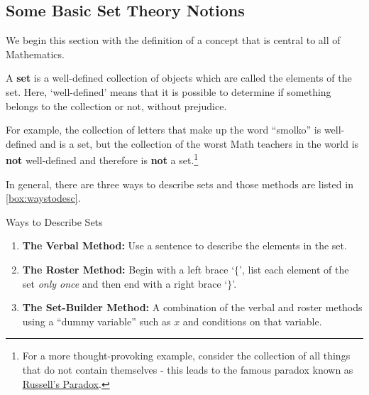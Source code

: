 

\setcounter{footnote}{0}

\label{AppSetTheory}

\subsection{Some Basic Set Theory Notions}
\label{SetTheoryNotions}

We begin this section with the definition of a concept that is central to all of Mathematics.

\medskip

\begin{tcolorbox}
\begin{defn} \label{setdef}

A \textbf{set} is a well-defined collection of objects which are called the elements of the set.  Here, `well-defined' means that it is possible to determine if something belongs to the collection or not, without prejudice. 
\end{defn}
\end{tcolorbox}

For example, the collection of letters that make up the word ``smolko'' is well-defined and is a set, but the collection of the worst Math teachers in the world is \textbf{not} well-defined and therefore is \textbf{not} a set.\footnote{For a more thought-provoking example, consider the collection of all things that do not contain themselves - this leads to the famous paradox known as \href{http://en.wikipedia.org/wiki/Russell's_paradox}{\underline{Russell's Paradox}}.}  

In general, there are three ways to describe sets and those methods are listed in \autoref{box:waystodesc}.

\begin{floatbox}{Ways to Describe Sets}
\label{box:waystodesc}
\begin{enumerate}

\item \textbf{The Verbal Method:} Use a sentence to describe the elements in the set.

\item \textbf{The Roster Method:}  Begin with a left brace `$\{$', list each element of the set \textit{only once} and then end with a right brace `$\}$'.

\item \textbf{The Set-Builder Method:} A combination of the verbal and roster methods using a ``dummy variable'' such as $x$ and conditions on that variable.

\end{enumerate}
\end{floatbox}

